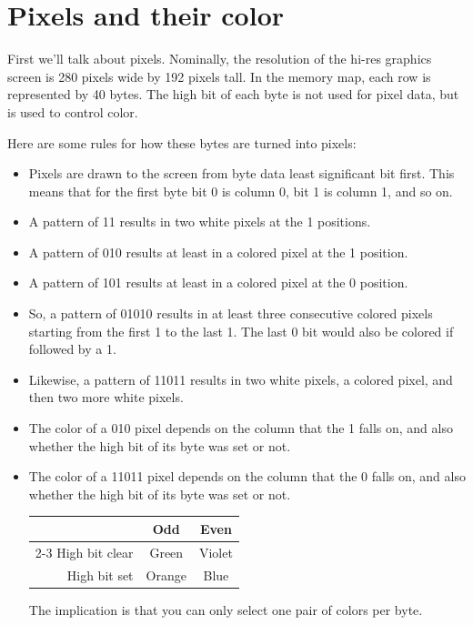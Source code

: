 \documentclass[10pt]{report}
\begin{document}
\section{Pixels and their color}
First we'll talk about pixels. Nominally, the resolution of the hi-res graphics screen
is 280 pixels wide by 192 pixels tall. In the memory map, each row is represented
by 40 bytes. The high bit of each byte is not used for pixel data, but is used to
control color.

Here are some rules for how these bytes are turned into pixels:
\begin{itemize}
  \item Pixels are drawn to the screen from byte data least significant bit first.
        This means that for the first byte bit 0 is column 0, bit 1 is column 1,
        and so on.
  \item A pattern of {\Tt{}11\nwendquote} results in two white pixels at the {\Tt{}1\nwendquote} positions.
  \item A pattern of {\Tt{}010\nwendquote} results at least in a colored pixel at the {\Tt{}1\nwendquote} position.
  \item A pattern of {\Tt{}101\nwendquote} results at least in a colored pixel at the {\Tt{}0\nwendquote} position.
  \item So, a pattern of {\Tt{}01010\nwendquote} results in at least three consecutive colored
        pixels starting from the first {\Tt{}1\nwendquote} to the last {\Tt{}1\nwendquote}. The last {\Tt{}0\nwendquote} bit
        would also be colored if followed by a {\Tt{}1\nwendquote}.
  \item Likewise, a pattern of {\Tt{}11011\nwendquote} results in two white pixels, a colored pixel,
        and then two more white pixels.
  \item The color of a {\Tt{}010\nwendquote} pixel depends on the column that the {\Tt{}1\nwendquote} falls on, and
        also whether the high bit of its byte was set or not. 
  \item The color of a {\Tt{}11011\nwendquote} pixel depends on the column that the {\Tt{}0\nwendquote} falls on, and
        also whether the high bit of its byte was set or not.

        \begin{center}
        \begin{tabular}{@{}rcc@{}} \toprule
        & Odd & Even \\ \cmidrule(r){2-3}
        High bit clear & Green & Violet \\
        High bit set & Orange & Blue \\ \bottomrule
        \end{tabular}
        \end{center}

        The implication is that you can only select one pair of colors per byte.
\end{itemize}
\end{document}
